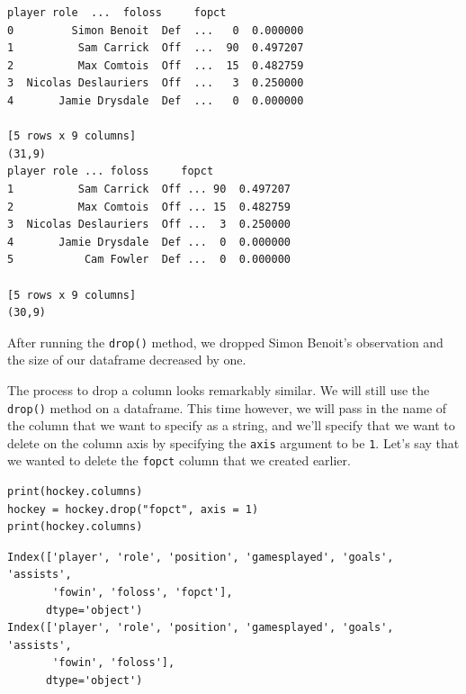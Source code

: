 \begin{lstlisting}[style=none]
player role  ...  foloss     fopct
0         Simon Benoit  Def  ...   0  0.000000
1          Sam Carrick  Off  ...  90  0.497207
2          Max Comtois  Off  ...  15  0.482759
3  Nicolas Deslauriers  Off  ...   3  0.250000
4       Jamie Drysdale  Def  ...   0  0.000000

[5 rows x 9 columns]
(31,9)
player role ... foloss     fopct
1          Sam Carrick  Off ... 90  0.497207
2          Max Comtois  Off ... 15  0.482759
3  Nicolas Deslauriers  Off ...  3  0.250000
4       Jamie Drysdale  Def ...  0  0.000000
5           Cam Fowler  Def ...  0  0.000000

[5 rows x 9 columns]
(30,9)
\end{lstlisting}
After running the \verb|drop()| method, we dropped Simon Benoit's observation and the size of our dataframe decreased by one.\par
{}
The process to drop a column looks remarkably similar. We will still use the \verb|drop()| method on a dataframe. This time however, we will pass in the name of the column that we want to specify as a string, and we'll specify that we want to delete on the column axis by specifying the \verb|axis| argument to be \verb|1|. Let's say that we wanted to delete the \verb|fopct| column that we created earlier.\par
\begin{lstlisting}[style=pippython]
print(hockey.columns)
hockey = hockey.drop("fopct", axis = 1)
print(hockey.columns)
\end{lstlisting}
\begin{lstlisting}[style=none]
Index(['player', 'role', 'position', 'gamesplayed', 'goals', 'assists',
       'fowin', 'foloss', 'fopct'],
      dtype='object')
Index(['player', 'role', 'position', 'gamesplayed', 'goals', 'assists',
       'fowin', 'foloss'],
      dtype='object')
\end{lstlisting}


